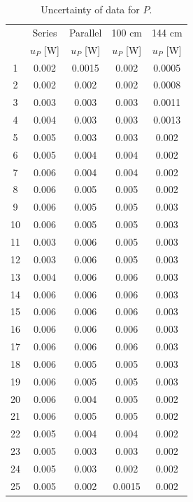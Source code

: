 \documentclass[a4paper]{article}
\begin{document}
\begin{table}[H]\centering
	\begin{tabular}{c|cccc}
		\hline
		   & Series    & Parallel  & 100 cm    & 144 cm    \\
		   & $u_P$ [W] & $u_P$ [W] & $u_P$ [W] & $u_P$ [W] \\
		\hline
		1  & 0.002     & 0.0015    & 0.002     & 0.0005    \\
		2  & 0.002     & 0.002     & 0.002     & 0.0008    \\
		3  & 0.003     & 0.003     & 0.003     & 0.0011    \\
		4  & 0.004     & 0.003     & 0.003     & 0.0013    \\
		5  & 0.005     & 0.003     & 0.003     & 0.002     \\
		6  & 0.005     & 0.004     & 0.004     & 0.002     \\
		7  & 0.006     & 0.004     & 0.004     & 0.002     \\
		8  & 0.006     & 0.005     & 0.005     & 0.002     \\
		9  & 0.006     & 0.005     & 0.005     & 0.003     \\
		10 & 0.006     & 0.005     & 0.005     & 0.003     \\
		11 & 0.003     & 0.006     & 0.005     & 0.003     \\
		12 & 0.003     & 0.006     & 0.005     & 0.003     \\
		13 & 0.004     & 0.006     & 0.006     & 0.003     \\
		14 & 0.006     & 0.006     & 0.006     & 0.003     \\
		15 & 0.006     & 0.006     & 0.006     & 0.003     \\
		16 & 0.006     & 0.006     & 0.006     & 0.003     \\
		17 & 0.006     & 0.006     & 0.006     & 0.003     \\
		18 & 0.006     & 0.005     & 0.005     & 0.003     \\
		19 & 0.006     & 0.005     & 0.005     & 0.003     \\
		20 & 0.006     & 0.004     & 0.005     & 0.002     \\
		21 & 0.006     & 0.005     & 0.005     & 0.002     \\
		22 & 0.005     & 0.004     & 0.004     & 0.002     \\
		23 & 0.005     & 0.003     & 0.003     & 0.002     \\
		24 & 0.005     & 0.003     & 0.002     & 0.002     \\
		25 & 0.005     & 0.002     & 0.0015    & 0.002     \\
		\hline
	\end{tabular}
	\caption{Uncertainty of data for $P$.}
	\label{table::unP}
\end{table}
\end{document}
